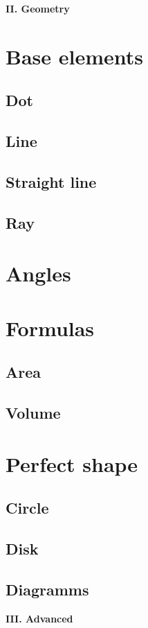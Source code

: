\documentclass[a4paper]{article}
\begin{document}
\begin{multicols}{2}
		\columnbreak

		{\huge \textbf{II. Geometry}}

		{\Large \section {Base elements}}
		\subsection{Dot}
		\subsection{Line}
		\subsection{Straight line}
		\subsection{Ray}
		{\Large \section {Angles}}
		{\Large \section {Formulas}}
		\subsection{Area}
		\subsection{Volume}
		{\Large \section {Perfect shape}}
		\subsection{Circle}
		\subsection{Disk}
		\subsection{Diagramms}	

		{\huge \textbf{III. Advanced}}


\end{multicols}
\end{document}
